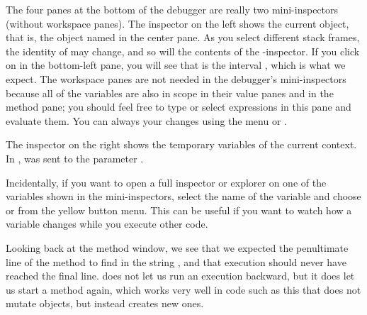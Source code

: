 \documentclass[a4paper,10pt,twoside]{book}
\begin{document}
The four panes at the bottom of the debugger are really two mini-inspectors (without workspace panes).
The inspector on the left shows the current object, that is, the object named \self in the center pane.
As you select different stack frames, the identity of \self may change, and so will the contents of the \self{}-inspector.
If you click on \self in the bottom-left pane, you will see that \self is the interval , which is what we expect.
The workspace panes are not needed in the debugger's mini-inspectors because all of the variables are also in scope in their value panes and in the method pane; you should feel free to type or select expressions in this pane and evaluate them.
You can always  your changes using the menu or .

The inspector on the right shows the temporary variables of the current context.
In ,  was sent to the parameter .


Incidentally, if you want to open a full inspector or explorer on one of the variables shown in the mini-inspectors, select the name of the variable and choose  or  from the yellow button menu.
This can be useful if you want to watch how a variable changes while you execute other code.

Looking back at the method window, we see that we expected the penultimate line of the  method to find  in the string , and that execution should never have reached the final line.
\sq does not let us run an execution backward, but it does let us start a method again, which works very well in code such as this that does not mutate objects, but instead creates new ones.

\end{document}
